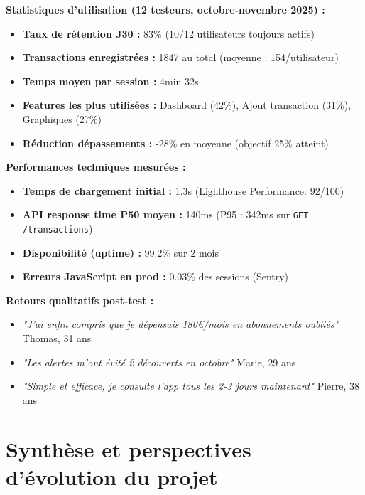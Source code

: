 \begin{tcolorbox}[colback=yellow!5!white,colframe=yellow!60!black,title=\textbf{Métriques de production (après 2 mois de test)}]
\textbf{Statistiques d'utilisation (12 testeurs, octobre-novembre 2025) :}
\begin{itemize}
    \item \textbf{Taux de rétention J30 :} 83\% (10/12 utilisateurs toujours actifs)
    \item \textbf{Transactions enregistrées :} 1847 au total (moyenne : 154/utilisateur)
    \item \textbf{Temps moyen par session :} 4min 32s
    \item \textbf{Features les plus utilisées :} Dashboard (42\%), Ajout transaction (31\%), Graphiques (27\%)
    \item \textbf{Réduction dépassements :} -28\% en moyenne (objectif 25\% atteint)
\end{itemize}

\textbf{Performances techniques mesurées :}
\begin{itemize}
    \item \textbf{Temps de chargement initial :} 1.3s (Lighthouse Performance: 92/100)
    \item \textbf{API response time P50 moyen :} 140ms (P95 : 342ms sur \texttt{GET /transactions})
    \item \textbf{Disponibilité (uptime) :} 99.2\% sur 2 mois
    \item \textbf{Erreurs JavaScript en prod :} 0.03\% des sessions (Sentry)
\end{itemize}

\textbf{Retours qualitatifs post-test :}
\begin{itemize}
    \item[\textbullet] \textit{"J'ai enfin compris que je dépensais 180€/mois en abonnements oubliés"}  Thomas, 31 ans
    \item[\textbullet] \textit{"Les alertes m'ont évité 2 découverts en octobre"}  Marie, 29 ans
    \item[\textbullet] \textit{"Simple et efficace, je consulte l'app tous les 2-3 jours maintenant"}  Pierre, 38 ans
\end{itemize}
\end{tcolorbox}


\section{Synthèse et perspectives d'évolution du projet}

